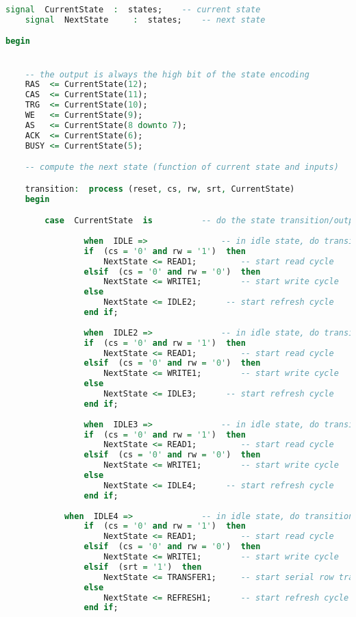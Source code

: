 \begin{lstlisting}[language=vhdl]
    signal  CurrentState  :  states;    -- current state
    signal  NextState     :  states;    -- next state

begin


    -- the output is always the high bit of the state encoding
    RAS  <= CurrentState(12);
    CAS  <= CurrentState(11);
    TRG  <= CurrentState(10);
    WE   <= CurrentState(9);
    AS   <= CurrentState(8 downto 7);
    ACK  <= CurrentState(6);
    BUSY <= CurrentState(5);

    -- compute the next state (function of current state and inputs)

    transition:  process (reset, cs, rw, srt, CurrentState)
    begin

        case  CurrentState  is          -- do the state transition/output   
				
				when  IDLE =>               -- in idle state, do transition
                if  (cs = '0' and rw = '1')  then
                    NextState <= READ1;         -- start read cycle
                elsif  (cs = '0' and rw = '0')  then
                    NextState <= WRITE1;        -- start write cycle
                else
                    NextState <= IDLE2;      -- start refresh cycle
                end if;
				
				when  IDLE2 =>              -- in idle state, do transition
                if  (cs = '0' and rw = '1')  then
                    NextState <= READ1;         -- start read cycle
                elsif  (cs = '0' and rw = '0')  then
                    NextState <= WRITE1;        -- start write cycle
                else
                    NextState <= IDLE3;      -- start refresh cycle
                end if;
				
				when  IDLE3 =>              -- in idle state, do transition
                if  (cs = '0' and rw = '1')  then
                    NextState <= READ1;         -- start read cycle
                elsif  (cs = '0' and rw = '0')  then
                    NextState <= WRITE1;        -- start write cycle
                else
                    NextState <= IDLE4;      -- start refresh cycle
                end if;
			
            when  IDLE4 =>              -- in idle state, do transition
                if  (cs = '0' and rw = '1')  then
                    NextState <= READ1;         -- start read cycle
                elsif  (cs = '0' and rw = '0')  then
                    NextState <= WRITE1;        -- start write cycle
                elsif  (srt = '1')  then
                    NextState <= TRANSFER1;     -- start serial row transfer
                else
                    NextState <= REFRESH1;      -- start refresh cycle
                end if;


\end{lstlisting}
